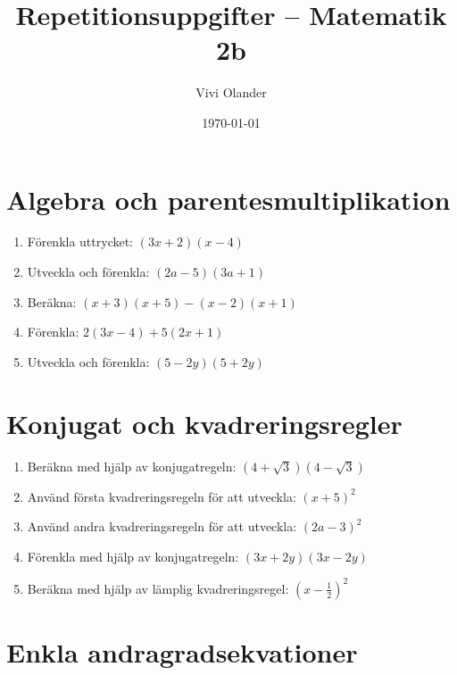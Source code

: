 \documentclass[a4paper,11pt]{article}
\title{Repetitionsuppgifter -- Matematik 2b}
\author{Vivi Olander}
\date{\today}
\begin{document}
\maketitle

\section{Algebra och parentesmultiplikation}

\begin{enumerate}[label=\textbf{\arabic*.}]
    \item Förenkla uttrycket: $(3x + 2)(x - 4)$
    
    \item Utveckla och förenkla: $(2a - 5)(3a + 1)$
    
    \item Beräkna: $(x + 3)(x + 5) - (x - 2)(x + 1)$
    
    \item Förenkla: $2(3x - 4) + 5(2x + 1)$
    
    \item Utveckla och förenkla: $(5 - 2y)(5 + 2y)$
\end{enumerate}

\section{Konjugat och kvadreringsregler}

\begin{enumerate}[label=\textbf{\arabic*.}]
    \item Beräkna med hjälp av konjugatregeln: $(4 + \sqrt{3})(4 - \sqrt{3})$
    
    \item Använd första kvadreringsregeln för att utveckla: $(x + 5)^2$
    
    \item Använd andra kvadreringsregeln för att utveckla: $(2a - 3)^2$
    
    \item Förenkla med hjälp av konjugatregeln: $(3x + 2y)(3x - 2y)$
    
    \item Beräkna med hjälp av lämplig kvadreringsregel: $(x - \frac{1}{2})^2$
\end{enumerate}

\section{Enkla andragradsekvationer}
\end{document}
